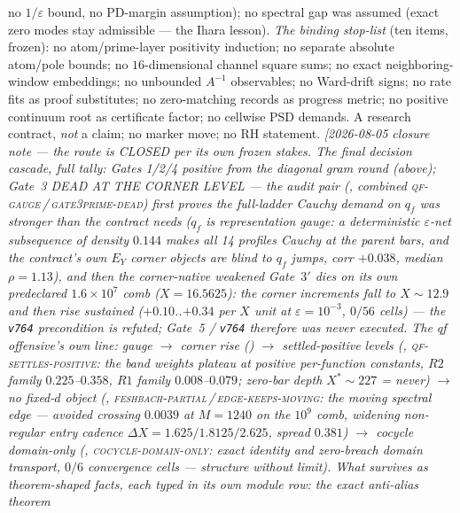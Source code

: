 \documentclass[11pt,a4paper]{article}
\begin{document}
{no $1/\varepsilon$ bound, no PD-margin assumption); no spectral gap
was assumed (exact zero modes stay admissible --- the Ihara
lesson).  \emph{The binding stop-list} (ten items, frozen): no
atom/prime-layer positivity induction; no separate absolute
atom/pole bounds; no $16$-dimensional channel square sums; no exact
neighboring-window embeddings; no unbounded $A^{-1}$ observables;
no Ward-drift signs; no rate fits as proof substitutes; no
zero-matching records as progress metric; no positive continuum
root as certificate factor; no cellwise PSD demands.  A research
contract, \emph{not} a claim; no marker move; no RH
statement.
\emph{[2026-08-05 closure note --- the route is CLOSED per its own
frozen stakes.  The final decision cascade, full tally: Gates
1/2/4 positive from the diagonal gram round (above); Gate~3 DEAD
AT THE CORNER LEVEL --- the audit pair
(, combined
\textsc{qf-gauge}\,/\,\textsc{gate3prime-dead}) first proves the
full-ladder Cauchy demand on $q_f$ was \emph{stronger} than the
contract needs ($q_f$ is representation gauge: a deterministic
$\varepsilon$-net subsequence of density $0.144$ makes all 14
profiles Cauchy at the parent bars, and the contract's own $E_Y$
corner objects are blind to $q_f$ jumps, corr $+0.038$, median
$\rho=1.13$), and then the corner-native weakened Gate~$3'$ dies
on its own predeclared $1.6\times10^{7}$ comb ($X=16.5625$): the
corner increments fall to $X\sim12.9$ and then rise sustained
($+0.10$..$+0.34$ per $X$ unit at $\varepsilon=10^{-3}$, $0/56$
cells) --- the \texttt{v764} precondition is refuted; Gate~5 /
\texttt{v764} therefore was \emph{never executed}.  The qf
offensive's own line: gauge $\to$ corner rise
() $\to$ settled-positive
levels (,
\textsc{qf-settles-positive}: the band weights plateau at
positive per-function constants, $R2$ family $0.225$--$0.358$,
$R1$ family $0.008$--$0.079$; zero-bar depth $X^{*}\sim227$ =
never) $\to$ no fixed-$d$ object
(,
\textsc{feshbach-partial}\,/\,\textsc{edge-keeps-moving}: the
moving spectral edge --- avoided crossing $0.0039$ at $M=1240$ on
the $10^{9}$ comb, widening non-regular entry cadence $\Delta X =
1.625/1.8125/2.625$, spread $0.381$) $\to$ cocycle domain-only
(,
\textsc{cocycle-domain-only}: exact identity and zero-breach
domain transport, $0/6$ convergence cells --- structure without
limit).  What survives as theorem-shaped facts, each typed in its
own module row: the exact anti-alias theorem
}}
\end{document}
